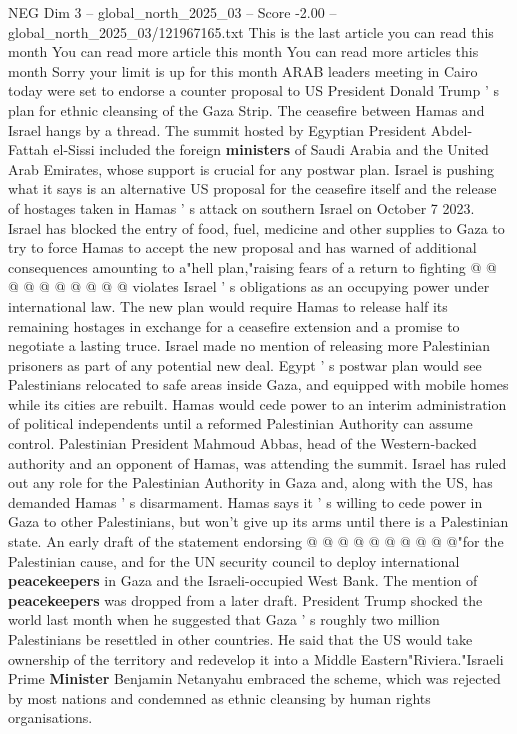 \begin{textsample}{NEG Dim 3 – global\_north\_2025\_03 – Score -2.00 – global\_north\_2025\_03/121967165.txt}  \label{ex:f3_neg_428}
This is the last article you can read this month You can read more article this month You can read more articles this month Sorry your limit is up for this month ARAB leaders meeting in Cairo today were set to endorse a counter proposal to US President Donald Trump ' s plan for ethnic cleansing of the Gaza Strip.
The ceasefire between Hamas and Israel hangs by a thread.
The summit hosted by Egyptian President Abdel-Fattah el-Sissi included the foreign \textbf{ministers} of Saudi Arabia and the United Arab Emirates, whose support is crucial for any postwar plan.
Israel is pushing what it says is an alternative US proposal for the ceasefire itself and the release of hostages taken in Hamas ' s attack on southern Israel on October 7 2023.
Israel has blocked the entry of food, fuel, medicine and other supplies to Gaza to try to force Hamas to accept the new proposal and has warned of additional consequences amounting to a"hell plan,"raising fears of a return to fighting @ @ @ @ @ @ @ @ @ @ violates Israel ' s obligations as an occupying power under international law.
The new plan would require Hamas to release half its remaining hostages in exchange for a ceasefire extension and a promise to negotiate a lasting truce.
Israel made no mention of releasing more Palestinian prisoners as part of any potential new deal.
Egypt ' s postwar plan would see Palestinians relocated to safe areas inside Gaza, and equipped with mobile homes while its cities are rebuilt.
Hamas would cede power to an interim administration of political independents until a reformed Palestinian Authority can assume control.
Palestinian President Mahmoud Abbas, head of the Western-backed authority and an opponent of Hamas, was attending the summit.
Israel has ruled out any role for the Palestinian Authority in Gaza and, along with the US, has demanded Hamas ' s disarmament.
Hamas says it ' s willing to cede power in Gaza to other Palestinians, but won't give up its arms until there is a Palestinian state.
An early draft of the statement endorsing @ @ @ @ @ @ @ @ @ @"for the Palestinian cause, and for the UN security council to deploy international \textbf{peacekeepers} in Gaza and the Israeli-occupied West Bank.
The mention of \textbf{peacekeepers} was dropped from a later draft.
President Trump shocked the world last month when he suggested that Gaza ' s roughly two million Palestinians be resettled in other countries.
He said that the US would take ownership of the territory and redevelop it into a Middle Eastern"Riviera."Israeli Prime \textbf{Minister} Benjamin Netanyahu embraced the scheme, which was rejected by most nations and condemned as ethnic cleansing by human rights organisations.

\end{textsample}
